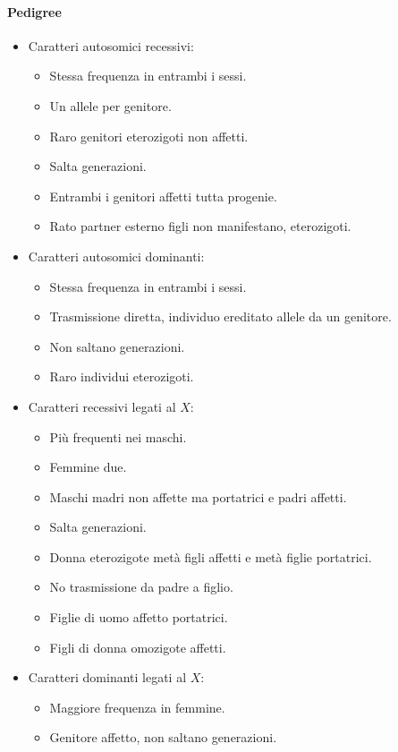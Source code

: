 \begin{multicols}{2}
\paragraph*{Pedigree}
\begin{itemize}
	\item Caratteri autosomici recessivi:
		\begin{itemize}
			\item Stessa frequenza in entrambi i sessi.
			\item Un allele per genitore.
			\item Raro genitori eterozigoti non affetti.
			\item Salta generazioni.
			\item Entrambi i genitori affetti tutta progenie.
			\item Rato partner esterno figli non manifestano, eterozigoti.
		\end{itemize}
	\item Caratteri autosomici dominanti:
		\begin{itemize}
			\item Stessa frequenza in entrambi i sessi.
			\item Trasmissione diretta, individuo ereditato allele da un genitore.
			\item Non saltano generazioni.
			\item Raro individui eterozigoti.
		\end{itemize}
	\item Caratteri recessivi legati al $X$:
		\begin{itemize}
			\item Pi\`u frequenti nei maschi.
			\item Femmine due.
			\item Maschi madri non affette ma portatrici e padri affetti.
			\item Salta generazioni.
			\item Donna eterozigote met\`a figli affetti e met\`a figlie portatrici.
			\item No trasmissione da padre a figlio.
			\item Figlie di uomo affetto portatrici.
			\item Figli di donna omozigote affetti.
		\end{itemize}
	\item Caratteri dominanti legati al $X$:
		\begin{itemize}
			\item Maggiore frequenza in femmine.
			\item Genitore affetto, non saltano generazioni.

\end{itemize}
\end{itemize}
\end{multicols}
